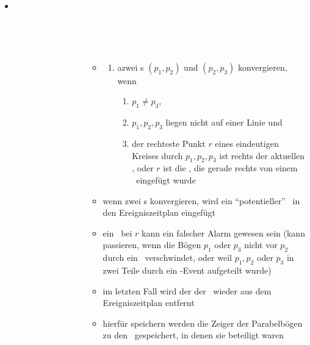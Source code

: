 \begin{itemize}
	\item[] \begin{description}
			\item[]\ \\\up\up \begin{description}
					\item[]\ \\\up
						\begin{description}
							\item[]\ \\\up
								\begin{minipage}{0.84\textwidth}
									\begin{itemize}
										\item[]
											\begin{enumerate}
											\setcounter{enumi}{\value{temp}}
												\item azwei \bpoint s $(p_1,p_2)$ und $(p_2,p_3)$ konvergieren, wenn
													\begin{enumerate}
														\item $p_1\neq p_3$,
														\item $p_1,p_2,p_3$ liegen nicht auf einer Linie und
														\item der rechteste Punkt $r$ eines eindeutigen Kreises durch $p_1,p_2,p_3$ ist rechts der aktuellen \sweep, oder $r$ ist die \site, die gerade rechts von einem \bpoint~eingefügt wurde
													\end{enumerate}
											\end{enumerate}
										\item wenn zwei \bpoint s konvergieren, wird ein ``potentieller'' \kreis~in den Ereigniszeitplan eingefügt
										\vspace*{-0.5\baselineskip}
										\item ein \kreis~bei $r$ kann ein falscher Alarm gewesen sein (kann passieren, wenn die Bögen $p_1$ oder $p_3$ nicht vor $p_2$ durch ein \kreis~verschwindet, oder weil $p_1,p_2$ oder $p_3$ in zwei Teile durch ein \site-Event aufgeteilt wurde)
										\vspace*{-0.5\baselineskip}
										\item im letzten Fall wird der der \kreis~wieder aus dem Ereigniszeitplan entfernt
										\vspace*{-0.5\baselineskip}
										\item hierfür speichern werden die Zeiger der Parabelbögen zu den \kreis~gespeichert, in denen sie beteiligt waren

\end{itemize}
\end{minipage}
\end{description}
\end{description}
\end{description}
\end{itemize}
